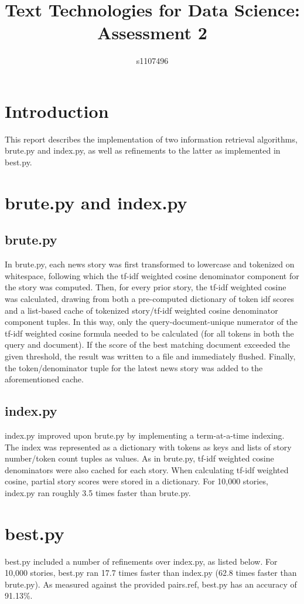 \documentclass{article}
\begin{document}
\title{Text Technologies for Data Science: Assessment 2}
\author{s1107496}

\maketitle

\section{Introduction}
This report describes the implementation of two information retrieval algorithms, brute.py and index.py, as well as refinements to the latter as implemented in best.py.

\section{brute.py and index.py}
\subsection{brute.py}
In brute.py, each news story was first transformed to lowercase and tokenized on whitespace, following which the tf-idf weighted cosine denominator component for the story was computed. Then, for every prior story, the tf-idf weighted cosine was calculated, drawing from both a pre-computed dictionary of token idf scores and a list-based cache of tokenized story/tf-idf weighted cosine denominator component tuples. In this way, only the query-document-unique numerator of the tf-idf weighted cosine formula needed to be calculated (for all tokens in both the query and document).  If the score of the best matching document exceeded the given threshold, the result was written to a file and immediately flushed. Finally, the token/denominator tuple for the latest news story was added to the aforementioned cache.
\subsection{index.py}
index.py improved upon brute.py by implementing a term-at-a-time indexing. The index was represented as a dictionary with tokens as keys and lists of story number/token count tuples as values. As in brute.py, tf-idf weighted cosine denominators were also cached for each story. When calculating tf-idf weighted cosine, partial story scores were stored in a dictionary. For 10,000 stories, index.py ran roughly 3.5 times faster than brute.py.

\section{best.py}
best.py included a number of refinements over index.py, as listed below. For 10,000 stories, best.py ran 17.7 times faster than index.py (62.8 times faster than brute.py). As measured against the provided pairs.ref, best.py has an accuracy of 91.13\%.
\end{document}
